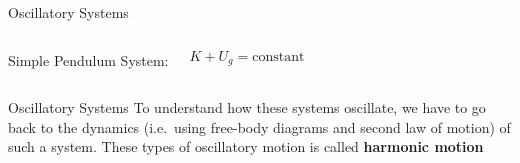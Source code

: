 \documentclass[12pt,compress,aspectratio=169]{beamer}
\begin{document}
\begin{frame}{Oscillatory Systems}
\begin{columns}[T]
    \centering

    {\footnotesize Simple Pendulum System:}\\
    \begin{displaymath}
      K+U_g=\text{constant}
    \end{displaymath}
  \end{columns}  
\end{frame}


\begin{frame}{Oscillatory Systems}
  To understand how these systems oscillate, we have to go back to the
  dynamics (i.e.\ using free-body diagrams and second law of motion) of such
  a system. These types of oscillatory motion is called \textbf{harmonic motion}
\end{frame}
\end{document}
